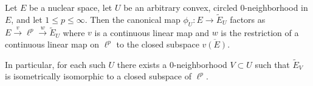 Let $E$ be a nuclear space, let $U$ be an arbitrary convex, circled $0$-neighborhood in $E$, and let $1 \leq p \leq \infty$. Then the canonical map $\phi_U: E \to \tilde{E}_U$ factors as $E \xrightarrow{v} \ell^p \xrightarrow{w} \tilde{E}_U$ where $v$ is a continuous linear map and $w$ is the restriction of a continuous linear map on $\ell^p$ to the closed subspace $\overline{v(E)}$.

In particular, for each such $U$ there exists a $0$-neighborhood $V \subset U$ such that $\tilde{E}_V$ is isometrically isomorphic to a closed subspace of $\ell^p$.
